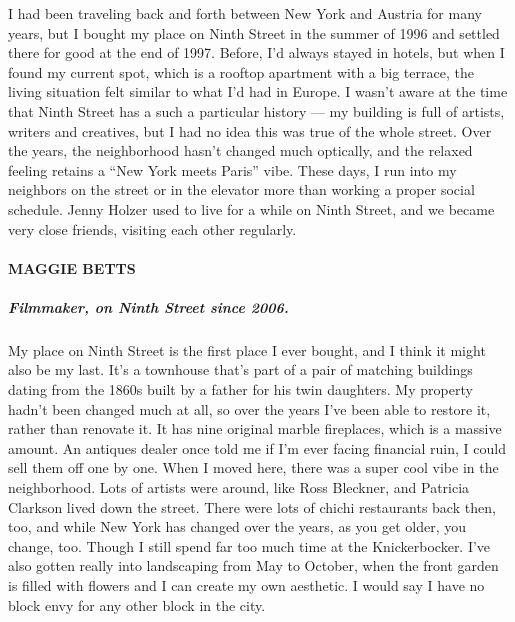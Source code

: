 I had been traveling back and forth between New York and Austria for
many years, but I bought my place on Ninth Street in the summer of 1996
and settled there for good at the end of 1997. Before, I'd always stayed
in hotels, but when I found my current spot, which is a rooftop
apartment with a big terrace, the living situation felt similar to what
I'd had in Europe. I wasn't aware at the time that Ninth Street has a
such a particular history --- my building is full of artists, writers
and creatives, but I had no idea this was true of the whole street. Over
the years, the neighborhood hasn't changed much optically, and the
relaxed feeling retains a ``New York meets Paris'' vibe. These days, I
run into my neighbors on the street or in the elevator more than working
a proper social schedule. Jenny Holzer used to live for a while on Ninth
Street, and we became very close friends, visiting each other regularly.

\hypertarget{maggie-betts}{%
\paragraph{MAGGIE BETTS}\label{maggie-betts}}

\hypertarget{filmmaker-on-ninth-street-since-2006}{%
\subparagraph{\texorpdfstring{\textbf{Filmmaker, on Ninth Street since
2006.}}{Filmmaker, on Ninth Street since 2006.}}\label{filmmaker-on-ninth-street-since-2006}}

My place on Ninth Street is the first place I ever bought, and I think
it might also be my last. It's a townhouse that's part of a pair of
matching buildings dating from the 1860s built by a father for his twin
daughters. My property hadn't been changed much at all, so over the
years I've been able to restore it, rather than renovate it. It has nine
original marble fireplaces, which is a massive amount. An antiques
dealer once told me if I'm ever facing financial ruin, I could sell them
off one by one. When I moved here, there was a super cool vibe in the
neighborhood. Lots of artists were around, like Ross Bleckner, and
Patricia Clarkson lived down the street. There were lots of chichi
restaurants back then, too, and while New York has changed over the
years, as you get older, you change, too. Though I still spend far too
much time at the Knickerbocker. I've also gotten really into landscaping
from May to October, when the front garden is filled with flowers and I
can create my own aesthetic. I would say I have no block envy for any
other block in the city.

